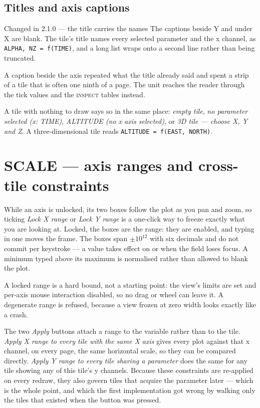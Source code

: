 \documentclass[11pt,a4paper,oneside]{report}
\newcommand{\code}[1]{\texttt{#1}}
\newcommand{\key}[1]{\textsf{\small\fbox{#1}}}
\newcommand{\tab}[1]{\textsc{#1}}
\begin{document}
\subsection{Titles and axis captions}

\begin{aoenew}{Changed in 2.1.0 --- the title carries the names}
The captions beside Y and under X are blank. The tile's title names every
selected parameter and the x channel, as \code{ALPHA, NZ = f(TIME)}, and a long
list wraps onto a second line rather than being truncated.

A caption beside the axis repeated what the title already said and spent a strip
of a tile that is often one ninth of a page. The unit reaches the reader through
the tick values and the \tab{inspect} tables instead.
\end{aoenew}

A tile with nothing to draw says so in the same place: \emph{empty tile},
\emph{no parameter selected (x: TIME)}, \emph{ALTITUDE (no x axis selected)}, or
\emph{3D tile --- choose X, Y and Z}. A three-dimensional tile reads
\code{ALTITUDE = f(EAST, NORTH)}.

\section{SCALE --- axis ranges and cross-tile constraints}

While an axis is unlocked, its two boxes follow the plot as you pan and zoom, so
ticking \emph{Lock X range} or \emph{Lock Y range} is a one-click way to freeze
exactly what you are looking at. Locked, the boxes are the range: they are
enabled, and typing in one moves the frame. The boxes span $\pm 10^{12}$ with six
decimals and do not commit per keystroke --- a value takes effect on
\key{Enter} or when the field loses focus. A minimum typed above its maximum is
normalised rather than allowed to blank the plot.

A locked range is a hard bound, not a starting point: the view's limits are set
and per-axis mouse interaction disabled, so no drag or wheel can leave it. A
degenerate range is refused, because a view frozen at zero width looks exactly
like a crash.

The two \emph{Apply} buttons attach a range to the variable rather than to the
tile. \emph{Apply X range to every tile with the same X axis} gives every plot
against that x channel, on every page, the same horizontal scale, so they can be
compared directly. \emph{Apply Y range to every tile sharing a parameter} does
the same for any tile showing any of this tile's y channels. Because these
constraints are re-applied on every redraw, they also govern tiles that acquire
the parameter later --- which is the whole point, and which the first
implementation got wrong by walking only the tiles that existed when the button
was pressed.
\end{document}

